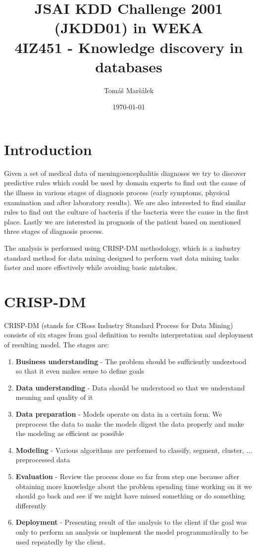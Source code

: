 \documentclass[11pt]{article}
\title{JSAI KDD Challenge 2001 (JKDD01) in WEKA \\ 4IZ451 - Knowledge discovery in databases}
\author{Tomáš Maršálek}
\date{\today}
\begin{document}
\maketitle
\thispagestyle{empty}
\clearpage

\section{Introduction}
Given a set of medical data of meningoencephalitis diagnoses we try to discover
predictive rules which could be used by domain experts to find out the cause of
the illness in various stages of diagnosis process (early symptoms, physical
examination and after laboratory results). We are also interested to find
similar rules to find out the culture of bacteria if the bacteria were the
cause in the first place. Lastly we are interested in prognosis of the patient
based on mentioned three stages of diagnosis process.

The analysis is performed using CRISP-DM methodology, which is a industry
standard method for data mining designed to perform vast data mining tasks
faster and more effectively while avoiding basic mistakes.


\section{CRISP-DM}
CRISP-DM (stands for CRoss Industry Standard Process for Data Mining) consists
of six stages from goal definition to results interpretation and deployment of
resulting model. The stages are:

\begin{enumerate}
    \item {\bf Business understanding} - The problem should be sufficiently understood so that it even makes sense to define goals
    \item {\bf Data understanding} - Data should be understood so that we understand meaning and quality of it
    \item {\bf Data preparation} - Models operate on data in a certain form. We preprocess the data to make the models digest the data properly and make the modeling as efficient as possible
    \item {\bf Modeling} - Various algorithms are performed to classify, segment, cluster, ... preprocessed data
    \item {\bf Evaluation} - Review the process done so far from step one because after obtaining more knowledge about the problem spending time working on it we should go back and see if we might have missed something or do something differently
    \item {\bf Deployment} - Presenting result of the analysis to the client if the goal was only to perform an analysis or implement the model programmatically to be used repeatedly by the client.
\end{enumerate}
\end{document}
